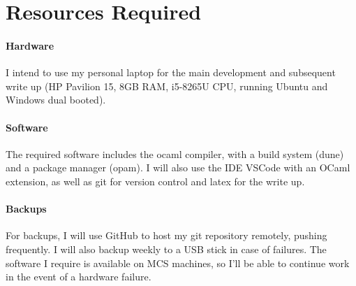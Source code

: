 \section*{Resources Required}

\paragraph*{Hardware}
I intend to use my personal laptop for the main development and subsequent write up (HP Pavilion 15, 8GB RAM, i5-8265U CPU, running Ubuntu and Windows dual booted).

\paragraph*{Software}
The required software includes the ocaml compiler, with a build system (dune) and a package manager (opam). I will also use the IDE VSCode with an OCaml extension, as well as git for version control and latex for the write up.

\paragraph*{Backups}
For backups, I will use GitHub to host my git repository remotely, pushing frequently. I will also backup weekly to a USB stick in case of failures. The software I require is available on MCS machines, so I'll be able to continue work in the event of a hardware failure.

